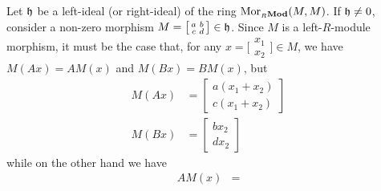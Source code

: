 \begin{example}
Let \(\mathfrak{h}\) be a left-ideal (or right-ideal) of the ring
\(\operatorname{Mor}_{{{}_{R}\textbf{Mod}}}(M, M)\). If \(\mathfrak{h} \neq 0\), consider a non-zero morphism
\(M =
\big[
\begin{smallmatrix}
  a & b \\
  c & d
\end{smallmatrix}
\big]
\in \mathfrak{h}\). Since \(M\) is a left-\(R\)-module morphism, it must be the
case that, for any
\(x =
\big[
\begin{smallmatrix}
  x_1 \\
  x_2
\end{smallmatrix}
\big]
\in M\), we have \(M(A x) = A M(x)\) and \(M(B x) = B M(x)\), but
%
\begin{align}
  \label{eq:M(Ax)}
  M(A x) &=
  \begin{bmatrix}
    a (x_1 + x_2) \\
    c (x_1 + x_2)
  \end{bmatrix}
  \\ %
  \label{eq:M(Bx)}
  M(B x) &=
  \begin{bmatrix}
    b x_2 \\
    d x_2
  \end{bmatrix}
\end{align}
while on the other hand we have
\begin{align}
  \label{eq:A(Mx)}
  A M(x) &=

\end{align}
\end{example}
